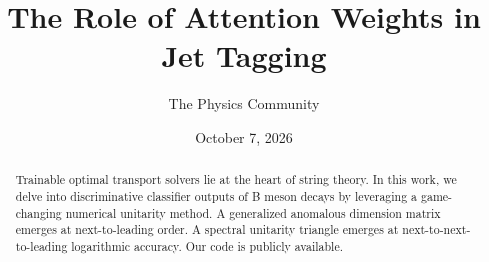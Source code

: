 \documentclass[11pt]{article}
\title{The Role of Attention Weights in Jet Tagging}
\author{The Physics Community}
\date{October 7, 2026}
\numberwithin{equation}{section}
\theoremstyle{definition}
\theoremstyle{remark}
\begin{document}
\maketitle
\begin{abstract}
Trainable optimal transport solvers lie at the heart of string theory.
In this work, we delve into discriminative classifier outputs of B meson
decays by leveraging a game-changing numerical unitarity method. A
generalized anomalous dimension matrix emerges at next-to-leading order.
A spectral unitarity triangle emerges at next-to-next-to-leading
logarithmic accuracy. Our code is publicly available.
\end{abstract}
\tableofcontents




\nocite{*}


\end{document}
